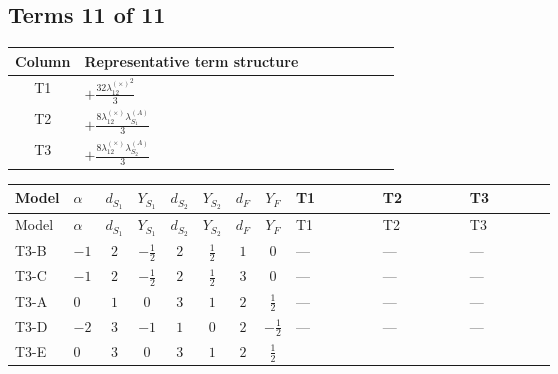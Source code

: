 \documentclass[8pt]{article}
\begin{document}
\begin{landscape}
\subsection*{Terms 11 of 11}
\begin{center}
\begin{tabular}{@{}c >{\raggedright\arraybackslash}p{0.82\linewidth}@{}}
\toprule
Column & Representative term structure \\
\midrule
T1 & \(\displaystyle +\frac{32 {\lambda_{12}^{(\times)}}^2}{3}\) \\
\midrule
T2 & \(\displaystyle +\frac{8 {\lambda_{12}^{(\times)}} {\lambda_{S_1}^{(A)}}}{3}\) \\
\midrule
T3 & \(\displaystyle +\frac{8 {\lambda_{12}^{(\times)}} {\lambda_{S_2}^{(A)}}}{3}\) \\
\midrule
\bottomrule
\end{tabular}
\end{center}
\smallskip
\tiny
\begin{longtable}{@{}llcccccc >{\raggedright\arraybackslash}p{0.21\linewidth} >{\raggedright\arraybackslash}p{0.21\linewidth} >{\raggedright\arraybackslash}p{0.21\linewidth}@{}}
\toprule
Model & $\alpha$ & $d_{S_1}$ & $Y_{S_1}$ & $d_{S_2}$ & $Y_{S_2}$ & $d_F$ & $Y_F$ & T1 & T2 & T3 \\
\midrule
\endfirsthead
\toprule
Model & $\alpha$ & $d_{S_1}$ & $Y_{S_1}$ & $d_{S_2}$ & $Y_{S_2}$ & $d_F$ & $Y_F$ & T1 & T2 & T3 \\
\midrule
\endhead
T3-B & $-1$ & $2$ & $-\frac{1}{2}$ & $2$ & $\frac{1}{2}$ & $1$ & $0$ & --- & --- & --- \\
\midrule
T3-C & $-1$ & $2$ & $-\frac{1}{2}$ & $2$ & $\frac{1}{2}$ & $3$ & $0$ & --- & --- & --- \\
\midrule
T3-A & $0$ & $1$ & $0$ & $3$ & $1$ & $2$ & $\frac{1}{2}$ & --- & --- & --- \\
\midrule
T3-D & $-2$ & $3$ & $-1$ & $1$ & $0$ & $2$ & $-\frac{1}{2}$ & --- & --- & --- \\
\midrule
T3-E & $0$ & $3$ & $0$ & $3$ & $1$ & $2$ & $\frac{1}{2}$ & \scriptsize\adjustbox{max width=\linewidth}{$\begin{gathered} +\frac{32 {\lambda_{12}^{(\times)}}^2}{3}\end{gathered}$} & \scriptsize\adjustbox{max width=\linewidth}{$\begin{gathered} +\frac{8 {\lambda_{12}^{(\times)}} {\lambda_{S_1}^{(A)}}}{3}\end{gathered}$} & \scriptsize\adjustbox{max width=\linewidth}{$\begin{gathered} +\frac{8 {\lambda_{12}^{(\times)}} {\lambda_{S_2}^{(A)}}}{3}\end{gathered}$} \\
\midrule
\bottomrule
\end{longtable}
\clearpage

\end{landscape}
\end{document}
